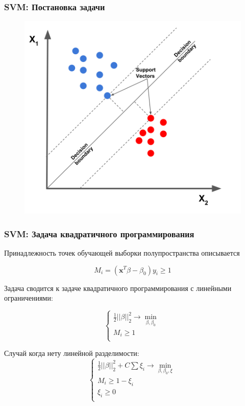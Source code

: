 \documentclass[11pt]{beamer}
\begin{document}
	\begin{frame}
		\frametitle{SVM: Постановка задачи}
		\begin{figure}
			\centering
			\includegraphics[width=0.7\linewidth]{../Report/imgs/svm}
			
			\label{fig:margins}
		\end{figure}
	\end{frame}

	\begin{frame}
		\frametitle{SVM: Задача квадратичного программирования}
		Принадлежность точек обучающей выборки полупространства описывается
		
		$$ M_i = (\bm{x}^T \beta -  \beta_0) y_i \geqslant 1 $$
		
		Задача сводится к задаче квадратичного программирования с линейными ограничениями:
		
		 $$
			 \begin{cases}
			 	\frac{1}{2}||\beta||_2^2\rightarrow \min\limits_{\beta,\beta_0} \\
			 	M_i  \geqslant 1 \\
			 \end{cases}
		 $$
	
		Случай когда нету линейной разделимости:
		$$
		\begin{cases}
			\frac{1}{2}||\beta||_2^2 + C \sum \xi_i \rightarrow \min\limits_{\beta,\beta_0, \xi} \\
			M_i \geqslant 1 - \xi_i \\
			\xi_i \geqslant 0 \\
		\end{cases}
		$$
	\end{frame}
\end{document}

